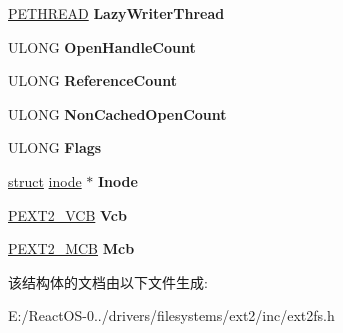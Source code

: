 \begin{DoxyCompactItemize}
\item 
\mbox{\label{struct___e_x_t2___f_c_b_a4945a91406e2b5e8ae394afecc5aec65}} 
\hyperlink{struct___e_t_h_r_e_a_d}{P\+E\+T\+H\+R\+E\+AD} {\bfseries Lazy\+Writer\+Thread}
\item 
\mbox{\label{struct___e_x_t2___f_c_b_a8141a055086c0d8502f2d6f37855e964}} 
U\+L\+O\+NG {\bfseries Open\+Handle\+Count}
\item 
\mbox{\label{struct___e_x_t2___f_c_b_a095973801e091b74104c8f8d23c55e27}} 
U\+L\+O\+NG {\bfseries Reference\+Count}
\item 
\mbox{\label{struct___e_x_t2___f_c_b_a3df8d758617cba6161e56fa3a8da009a}} 
U\+L\+O\+NG {\bfseries Non\+Cached\+Open\+Count}
\item 
\mbox{\label{struct___e_x_t2___f_c_b_aaea287d0082af153394833a4cea3c469}} 
U\+L\+O\+NG {\bfseries Flags}
\item 
\mbox{\label{struct___e_x_t2___f_c_b_a4a024b86f164543d8e93b175f9ea2a13}} 
\hyperlink{interfacestruct}{struct} \hyperlink{structinode}{inode} $\ast$ {\bfseries Inode}
\item 
\mbox{\label{struct___e_x_t2___f_c_b_a5857460736f80680d1db7e58f8cbc421}} 
\hyperlink{struct___e_x_t2___v_c_b}{P\+E\+X\+T2\+\_\+\+V\+CB} {\bfseries Vcb}
\item 
\mbox{\label{struct___e_x_t2___f_c_b_a3d2723aece688bfc86f2895579c0dd26}} 
\hyperlink{struct___e_x_t2___m_c_b}{P\+E\+X\+T2\+\_\+\+M\+CB} {\bfseries Mcb}
\end{DoxyCompactItemize}


该结构体的文档由以下文件生成\+:\begin{DoxyCompactItemize}
\item 
E\+:/\+React\+O\+S-\/0../drivers/filesystems/ext2/inc/ext2fs.\+h\end{DoxyCompactItemize}
